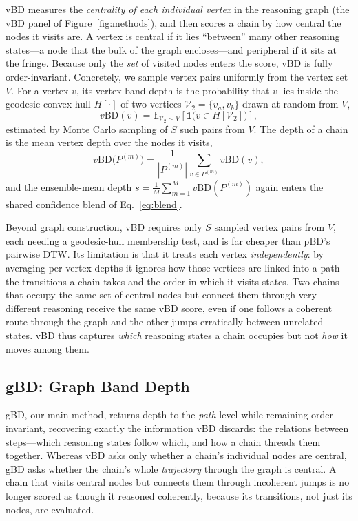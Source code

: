 \documentclass[letterpaper]{article} %
\begin{document}
vBD measures the \emph{centrality of each individual vertex} in the reasoning
graph (the vBD panel of Figure~\ref{fig:methods}), and then scores a chain by how
central the nodes it visits are. A vertex is central if it lies ``between'' many other reasoning
states---a node that the bulk of the graph encloses---and peripheral if it sits
at the fringe. Because
only the \emph{set} of visited nodes enters the score, vBD is fully
order-invariant. Concretely, we sample vertex pairs uniformly from the vertex set $V$. For a
vertex $v$, its vertex band depth is the probability that $v$ lies inside the
geodesic convex hull $H[\cdot]$ of two vertices
$\mathcal{V}_2 = \{v_a, v_b\}$ drawn at random from $V$,
\begin{equation}
  v\text{BD}(v) = \mathbb{E}_{\mathcal{V}_2 \sim V}\!\left[ \mathbf{1}\big(v \in H[\mathcal{V}_2]\big) \right],
\end{equation}
estimated by Monte Carlo sampling of $S$ such pairs from $V$. The depth of a
chain is the mean vertex depth over the nodes it visits,
\begin{equation}
  v\text{BD}\big(P^{(m)}\big) = \frac{1}{|P^{(m)}|} \sum_{v \in P^{(m)}} v\text{BD}(v),
\end{equation}
and the ensemble-mean depth $\bar{s} = \frac{1}{M} \sum_{m=1}^{M} v\text{BD}(P^{(m)})$
again enters the shared confidence blend of Eq.~\eqref{eq:blend}.

Beyond graph construction, vBD requires only $S$ sampled vertex pairs from $V$,
each needing a geodesic-hull membership test, and is far cheaper than pBD's
pairwise DTW. Its limitation is that it treats each vertex \emph{independently}:
by averaging per-vertex depths it ignores how those vertices are linked into a
path---the transitions a chain takes and the order in which it visits states.
Two chains that occupy the same set of central nodes but connect them through
very different reasoning receive the same vBD score, even if one follows a
coherent route through the graph and the other jumps erratically between
unrelated states. vBD thus captures \emph{which} reasoning states a chain
occupies but not \emph{how} it moves among them.

\subsection{gBD: Graph Band Depth}
\label{sec:method:gbd}

gBD, our main method, returns depth to the \emph{path} level while remaining
order-invariant, recovering exactly the information vBD discards: the relations
between steps---which reasoning states follow which, and how a chain threads them
together. Whereas vBD asks only whether a chain's individual nodes are central,
gBD asks whether the chain's whole \emph{trajectory} through the graph is central.
A chain that visits central nodes but connects them through incoherent jumps is
no longer scored as though it reasoned coherently, because its transitions, not
just its nodes, are evaluated.
\end{document}
